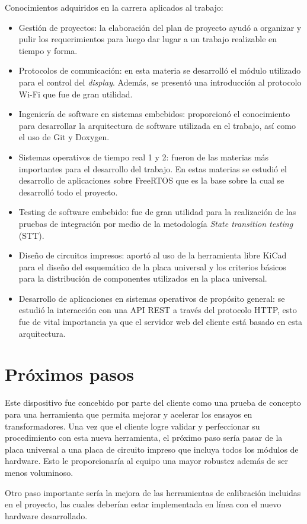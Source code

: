 Conocimientos adquiridos en la carrera aplicados al trabajo:
\begin{itemize}
\item Gestión de proyectos: la elaboración del plan de proyecto ayudó a organizar y pulir los requerimientos para luego dar lugar a un trabajo realizable en tiempo y forma.
\item Protocolos de comunicación: en esta materia se desarrolló el módulo utilizado para el control del \textit{display}. Además, se presentó una introducción al protocolo Wi-Fi que fue de gran utilidad.
\item Ingeniería de software en sistemas embebidos: proporcionó el conocimiento para desarrollar la arquitectura de software utilizada en el trabajo, así como el uso de Git y Doxygen.
\item Sistemas operativos de tiempo real 1 y 2: fueron de las materias más importantes para el desarrollo del trabajo. En estas materias se estudió el desarrollo de aplicaciones sobre FreeRTOS que es la base sobre la cual se desarrolló todo el proyecto.
\item Testing de software embebido: fue de gran utilidad para la realización de las pruebas de integración por medio de la metodología \textit{State transition testing} (STT).
\item Diseño de circuitos impresos: aportó al uso de la herramienta libre KiCad para el diseño del esquemático de la placa universal y los criterios básicos para la distribución de componentes utilizados en la placa universal.
\item Desarrollo de aplicaciones en sistemas operativos de propósito general: se estudió la interacción con una API REST a través del protocolo HTTP, esto fue de vital importancia ya que el servidor web del cliente está basado en esta arquitectura.
\end{itemize}

\section{Próximos pasos}

Este dispositivo fue concebido por parte del cliente como una prueba de concepto para una herramienta que permita mejorar y acelerar los ensayos en transformadores. Una vez que el cliente logre validar y perfeccionar su procedimiento con esta nueva herramienta, el próximo paso sería pasar de la placa universal a una placa de circuito impreso que incluya todos los módulos de hardware. Esto le proporcionaría al equipo una mayor robustez además de ser menos voluminoso.

Otro paso importante sería la mejora de las herramientas de calibración incluidas en el proyecto, las cuales deberían estar implementada en línea con el nuevo hardware desarrollado.
